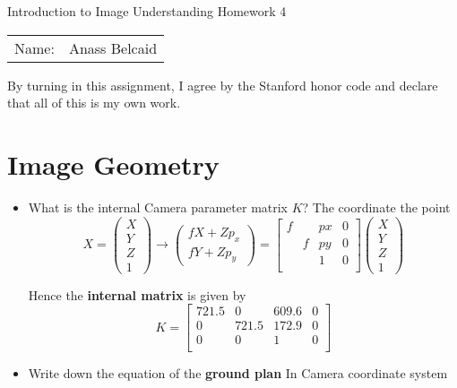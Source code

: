\documentclass[12pt]{article}
\begin{document}
\begin{center}
{\Large Introduction to Image Understanding Homework 4}

\begin{tabular}{rl}
Name: &  Anass Belcaid \\
\end{tabular}
\end{center}

By turning in this assignment, I agree by the Stanford honor code and declare
that all of this is my own work.


\section*{Image Geometry}
\begin{itemize}
  \item What is the internal Camera parameter matrix $K$?
    The coordinate the point 
    \begin{equation}
    X = \begin{pmatrix}
      X\\ Y \\ Z \\ 1
    \end{pmatrix}
     \rightarrow \begin{pmatrix}
       fX + Zp_x \\
       fY + Zp_y
     \end{pmatrix}
     = \begin{bmatrix}
       f &  & px & 0\\
         & f& py & 0\\
         &  & 1  & 0\\
     \end{bmatrix}
     \begin{pmatrix}
       X \\ Y \\ Z \\ 1
     \end{pmatrix}
   \end{equation}

   Hence the \textbf{internal matrix} is given by
  \begin{equation}
    K = \begin{bmatrix}
      721.5 & 0 & 609.6 & 0\\
      0     & 721.5 & 172.9 & 0\\
      0   & 0      & 1    & 0\\
    \end{bmatrix}
  \end{equation} 
\item Write down the equation of the \textbf{ground plan} In Camera coordinate
  system
\end{itemize}
\end{document}
